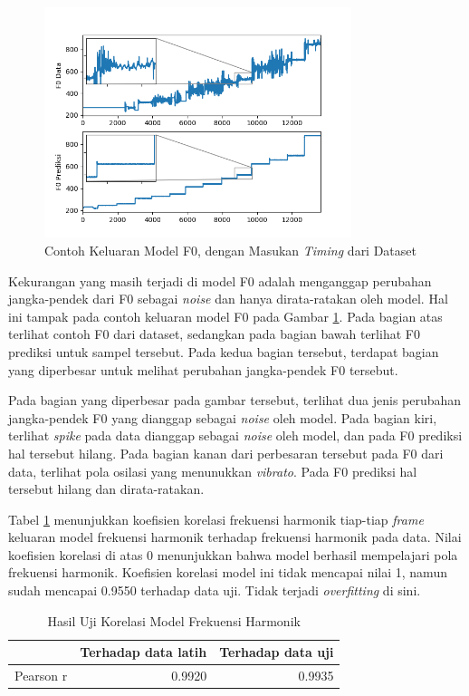\begin{figure}[h]
    \centering
    \includegraphics[width=0.8\textwidth]{resources/Analisis_F0.png}
    \caption{Contoh Keluaran Model F0, dengan Masukan \textit{Timing} dari Dataset}\label{fig-f0-output-sample}
\end{figure}

Kekurangan yang masih terjadi di model F0 adalah menganggap perubahan jangka-pendek dari F0 sebagai \textit{noise} dan hanya dirata-ratakan oleh model. Hal ini tampak pada contoh keluaran model F0 pada Gambar \ref{fig-f0-output-sample}. Pada bagian atas terlihat contoh F0 dari dataset, sedangkan pada bagian bawah terlihat F0 prediksi untuk sampel tersebut. Pada kedua bagian tersebut, terdapat bagian yang diperbesar untuk melihat perubahan jangka-pendek F0 tersebut. 

Pada bagian yang diperbesar pada gambar tersebut, terlihat dua jenis perubahan jangka-pendek F0 yang dianggap sebagai \textit{noise} oleh model. Pada bagian kiri, terlihat \textit{spike} pada data dianggap sebagai \textit{noise} oleh model, dan pada F0 prediksi hal tersebut hilang. Pada bagian kanan dari perbesaran tersebut pada F0 dari data, terlihat pola osilasi yang menunukkan \textit{vibrato}. Pada F0 prediksi hal tersebut hilang dan dirata-ratakan.

Tabel \ref{tab-freq-testing-results} menunjukkan koefisien korelasi frekuensi harmonik tiap-tiap \textit{frame} keluaran model frekuensi harmonik terhadap frekuensi harmonik pada data. Nilai koefisien korelasi di atas 0 menunjukkan bahwa model berhasil mempelajari pola frekuensi harmonik. Koefisien korelasi model ini tidak mencapai nilai 1, namun sudah mencapai 0.9550 terhadap data uji. Tidak terjadi \textit{overfitting} di sini.
\begin{table}[htbp]
    \centering
    \caption{Hasil Uji Korelasi Model Frekuensi Harmonik}\label{tab-freq-testing-results}
    \begin{tabular}{ |l|r|r| } 
     \cline{2-3}
     \multicolumn{1}{l|}{}&Terhadap data latih&Terhadap data uji\\\hline
	 Pearson r&0.9920  &0.9935\\\hline
    \end{tabular}
\end{table}

